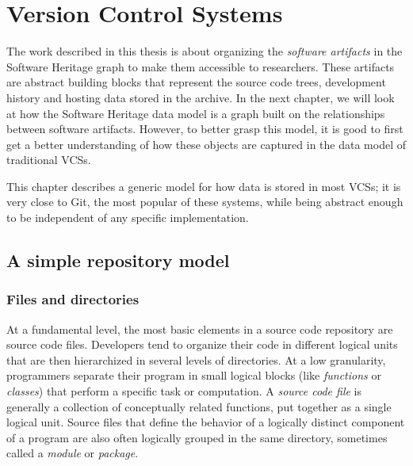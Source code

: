 \chapter{Version Control Systems}

The work described in this thesis is about organizing the \emph{software
artifacts} in the Software Heritage graph to make them accessible to
researchers. These artifacts are abstract building blocks that represent the
source code trees, development history and hosting data stored in the archive.
In the next chapter, we will look at how the Software Heritage data model is a
graph built on the relationships between software artifacts. However, to better
grasp this model, it is good to first get a better understanding of how
these objects are captured in the data model of traditional \glspl{VCS}.

This chapter describes a generic model for how data is stored in most
\glspl{VCS}; it is very close to Git, the most popular of these systems, while
being abstract enough to be independent of any specific implementation.

\section{A simple repository model}

\subsection{Files and directories}

At a fundamental level, the most basic elements in a source code repository are
source code files. Developers tend to organize their code in different logical
units that are then hierarchized in several levels of directories. At a low
granularity, programmers separate their program in small logical blocks (like
\emph{functions} or \emph{classes}) that perform a specific task or
computation. A \emph{source code file} is generally a collection of
conceptually related functions, put together as a single logical unit. Source
files that define the behavior of a logically distinct component of a program
are also often logically grouped in the same directory, sometimes called a
\emph{module} or \emph{package}.

